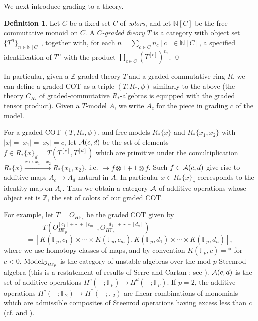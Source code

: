 \documentclass{gtpart}
\theoremstyle{definition}
\newtheorem{defn}[thm]{Definition}
\theoremstyle{remark}
\newcommand{\mb}[1]{\mathbb{#1}}
\newcommand{\Model}{{\rm Model}}
\begin{document}
We next introduce grading to a theory.  
\begin{defn}
 Let $C$ be a fixed set $C$ of {\em colors}, and let ${\mb N}[C]$ be the free 
 commutative monoid on $C$.  A {\em $C$-graded theory} $T$ is a category with 
 object set $\{T^n\}_{n \in {\mb N}[C]}$, together with, for each 
 $n = \sum_{c \in C} n_c[c] \in {\mb N}[C]$, a specified identification of 
 $T^n$ with the product $\prod_{c \in C} (T^{[c]})^{n_c}$.  \qed
\end{defn}
In particular, given a $\mb Z$-graded theory $T$ and a graded-commutative ring 
$R$, we can define a graded COT as a triple $(T,R_*,\phi)$ similarly to the 
above (the theory $C_{R_*}$ of graded-commutative $R_*$-algebras is equipped 
with the graded tensor product).  Given a $T$-model $A$, we write $A_c$ for 
the piece in grading $c$ of the model.  

For a graded COT $(T,R_*,\phi)$, and free models $R_*\{x\}$ and 
$R_*\{x_1,x_2\}$ with $|x| = |x_1| = |x_2| = c$, let ${\cal A}(c,d)$ be the 
set of elements $f \in R_*\{x\}_d = T(T^{[c]},T^{[d]})$ which are primitive 
under the comultiplication $R_*\{x\} \xrightarrow{x \mapsto x_1 + x_2} 
R_*\{x_1,x_2\}$, i.e. $\mapsto f \otimes 1 + 1 \otimes f$.  
Such $f \in {\cal A}(c,d)$ give rise to additive maps $A_c \to A_d$ natural in 
$A$.  In particular $x \in R_*\{x\}_c$ corresponds to the identity map on 
$A_c$.  Thus we obtain a category $\cal A$ of additive operations whose object 
set is $\mb Z$, the set of colors of our graded COT.  

For example, let $T = O_{H{\mb F}_p}$ be the graded COT given by 
\[
 T(O_{H{\mb F}_p}^{[c_1]+\cdots+[c_m]}, O_{H{\mb F}_p}^{[d_1]+\cdots+[d_n]}) 
 ~~~~~~~~~~~~~~~~~~~~~~~~~~~~~~~~~~~~~~~~~~~
\]
\[
 = [K({\mb F}_p,c_1) \times \cdots \times K({\mb F}_p,c_m), 
 K({\mb F}_p,d_1) \times \cdots \times K({\mb F}_p,d_n)], 
\]
where we use homotopy classes of maps, and by convention $K({\mb F}_p,c) = *$ 
for $c<0$.  $\Model_{O_{H{\mb F}_p}}$ is the category of unstable algebras 
over the mod-$p$ Steenrod algebra (this is a restatement of results of Serre 
\cite{serre} and Cartan \cite{cartan}; see \cite[II.\S5]{steenrod}).  
${\cal A}(c,d)$ is the set of additive operations 
$H^c(-;{\mb F}_p) \to H^d(-;{\mb F}_p)$.  If $p=2$, the additive operations 
$H^c(-;{\mb F}_2) \to H^*(-;{\mb F}_2)$ are linear combinations of monomials 
which are admissible composites of Steenrod operations having excess less than 
$c$ (cf. \cite[theorem 2 of \S4]{serre} and 
\cite[chapters 3 and 9]{moshertangora}).  
\end{document}
